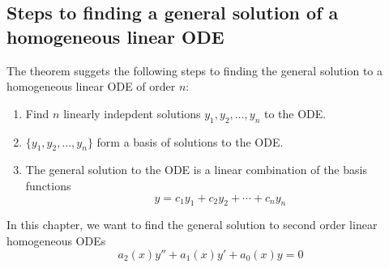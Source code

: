 \documentclass[openany]{report}
\begin{document}
\subsection{Steps to finding a general solution of a homogeneous linear ODE}
The theorem suggets the following steps to finding the general solution to a homogeneous linear ODE of order $n$:
\begin{enumerate}
    \item Find $n$ linearly indepdent solutions $y_1,y_2,\ldots,y_n$ to the ODE.
    \item $\{y_1, y_2,\ldots,y_n\}$ form a basis of solutions to the ODE.
    \item The general solution to the ODE is a linear combination of the basis functions 
    \[y = c_1 y_1 + c_2y_2 + \cdots + c_ny_n\]
\end{enumerate}
In this chapter, we want to find the general solution to second order linear homogeneous ODEs
\[a_2(x)y'' + a_1(x)y' + a_0(x)y = 0\]
\end{document}
